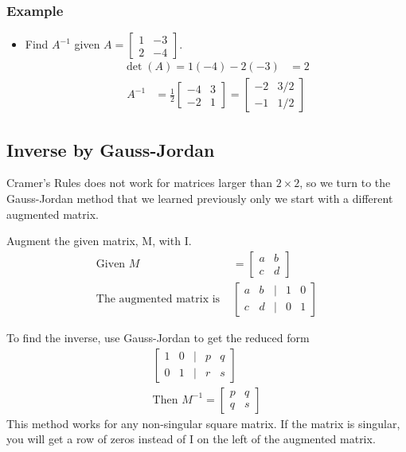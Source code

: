 \documentclass[14pt]{extarticle}
\begin{document}
\subsubsection{Example}
\begin{itemize}
	\item Find $A^{-1}$ given $A=\begin{bmatrix} 1 & -3 \\ 2 & -4	\end{bmatrix}$.
	\begin{align*}
		\det(A) = 1(-4) - 2(-3) &= 2
	\end{align*}
	\begin{align*}
		A^{-1} &= \frac{1}{2}\begin{bmatrix} -4 & 3 \\ -2 & 1	\end{bmatrix}
		= \begin{bmatrix} -2 & 3/2 \\ -1 & 1/2	\end{bmatrix}
	\end{align*}
\end{itemize}

\subsection{Inverse by Gauss-Jordan}
Cramer's Rules does not work for matrices larger than $2\times 2$, so we turn to the Gauss-Jordan method that we learned previously only we start with a different augmented matrix.

Augment the given matrix, M, with I.
\begin{align*}
	\text{Given } M &= \begin{bmatrix}
		a & b \\
		c & d
	\end{bmatrix} \\
	\text{The augmented matrix is }  &\begin{bmatrix}
		a & b & | & 1 & 0 \\
		c & d & | & 0 & 1
	\end{bmatrix}
\end{align*}

To find the inverse, use Gauss-Jordan to get the reduced form
\begin{align*}
	\begin{bmatrix}
		1 & 0 & | & p & q \\
		0 & 1 & | & r & s
	\end{bmatrix} \\
	\text{Then } M^{-1} = \begin{bmatrix}
		p & q \\
		q & s
	\end{bmatrix}
\end{align*}
This method works for any non-singular square matrix. If the matrix is singular, you will get a row of zeros instead of I on the left of the augmented matrix.
\end{document}
